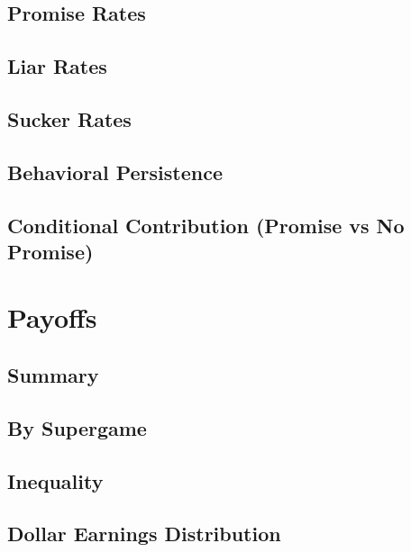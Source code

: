 \documentclass[11pt, landscape]{article}
\begin{document}
\subsection{Promise Rates}


\subsection{Liar Rates}


\subsection{Sucker Rates}


\subsection{Behavioral Persistence}


\subsection{Conditional Contribution (Promise vs No Promise)}


\newpage

\section{Payoffs}

\subsection{Summary}


\subsection{By Supergame}


\subsection{Inequality}


\subsection{Dollar Earnings Distribution}

\end{document}
